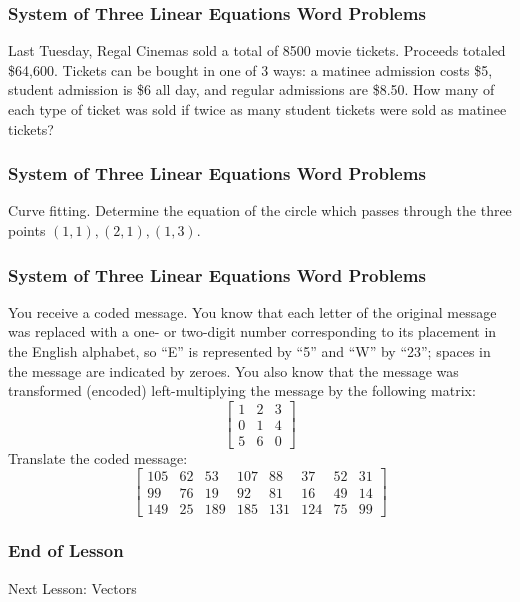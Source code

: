 \documentclass[xcolor=dvipsnames]{beamer}
\begin{document}
\begin{frame}
  \frametitle{System of Three Linear Equations Word Problems}
  {\ubung} Last Tuesday, Regal Cinemas sold a total of 8500 movie
  tickets. Proceeds totaled \$64,600. Tickets can be bought in one of
  3 ways: a matinee admission costs \$5, student admission is \$6 all
  day, and regular admissions are \$8.50. How many of each type of
  ticket was sold if twice as many student tickets were sold as
  matinee tickets?
\end{frame}

\begin{frame}
  \frametitle{System of Three Linear Equations Word Problems}
  {\ubung} Curve fitting. Determine the equation of the circle which
  passes through the three points $(1,1),(2,1),(1,3)$. 
\end{frame}

\begin{frame}
  \frametitle{System of Three Linear Equations Word Problems}
  {\ubung} You receive a coded message. You know that each letter of
  the original message was replaced with a one- or two-digit number
  corresponding to its placement in the English alphabet, so ``E'' is
  represented by ``5'' and ``W'' by ``23''; spaces in the message are
  indicated by zeroes. You also know that the message was transformed
  (encoded) left-multiplying the message by the following matrix:
\begin{equation}
  \label{eq:iephaeke}
  \left[
    \begin{array}{ccc}
    1 & 2  & 3  \\
    0 & 1  & 4  \\
    5 & 6  & 0 
  \end{array}\right]
\end{equation}
Translate the coded message:
\begin{equation}
  \label{eq:euseeyee}
  \left[
    \begin{array}{cccccccc}
    105   & 62 & 53  & 107 & 88  & 37  & 52 & 31 \\
    99    & 76 & 19  & 92  & 81  & 16  & 49 & 14 \\
    149   & 25 & 189 & 185 & 131 & 124 & 75 & 99
  \end{array}\right]
\end{equation}
\end{frame}

\begin{frame}
  \frametitle{End of Lesson}
Next Lesson: Vectors
\end{frame}
\end{document}
